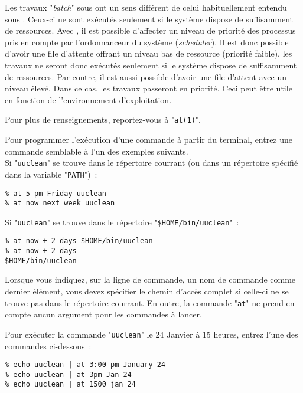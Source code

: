 \begin{remarque}
Les travaux "{\sl batch}" sous {\Unix} ont un sens diff{\'e}rent de celui
habituellement entendu sous {\OpenVMS}. Ceux-ci ne sont ex{\'e}cut{\'e}s seulement
si le syst{\`e}me dispose de suffisamment de ressources. Avec {\OpenVMS}, il est possible
d'affecter un niveau de priorit{\'e} des processus pris en compte par l'ordonnanceur du
syst{\`e}me ({\sl scheduler}). Il est donc possible d'avoir une file d'attente offrant
un niveau bas de ressource (priorit{\'e} faible), les travaux ne seront donc ex{\'e}cut{\'e}s
seulement si le syst{\`e}me dispose de suffisamment de ressources. Par contre, il est
aussi possible d'avoir une file d'attent avec un niveau {\'e}lev{\'e}. Dans ce cas, les travaux
passeront en priorit{\'e}. Ceci peut {\^e}tre utile en fonction de l'environnement
d'exploitation.
\end{remarque}

Pour plus de renseignements, reportez-vous {\`a} "{\tt at(1)}".

\begin{example}
Pour programmer l'ex{\'e}cution d'une commande {\`a} partir du terminal, entrez une commande
semblable {\`a} l'un des exemples suivants.\\
Si "{\tt uuclean}" se trouve dans le r{\'e}pertoire courrant (ou dans un r{\'e}pertoire sp{\'e}cifi{\'e} dans la
variable "{\tt PATH}")~:
\begin{verbatim}
% at 5 pm Friday uuclean
% at now next week uuclean
\end{verbatim}
Si "{\tt uuclean}" se trouve dans le r{\'e}pertoire "\verb=$HOME/bin/uuclean="~:
\begin{verbatim}
% at now + 2 days $HOME/bin/uuclean
% at now + 2 days
$HOME/bin/uuclean
\end{verbatim}
\end{example}

\begin{remarque}
Lorsque vous indiquez, sur la ligne de commande, un nom de commande
comme dernier {\'e}l{\'e}ment, vous devez sp{\'e}cifier le chemin d'acc{\`e}s complet si
celle-ci ne se trouve pas dans le r{\'e}pertoire courrant. En outre, la
commande "{\tt at}" ne prend en compte aucun argument pour les
commandes {\`a} lancer.
\end{remarque}

\begin{example}
Pour ex{\'e}cuter la commande "{\tt uuclean}" le 24 Janvier {\`a} 15 heures, entrez l'une des
commandes ci-dessous~:
\begin{verbatim}
% echo uuclean | at 3:00 pm January 24
% echo uuclean | at 3pm Jan 24
% echo uuclean | at 1500 jan 24
\end{verbatim}
\end{example}

